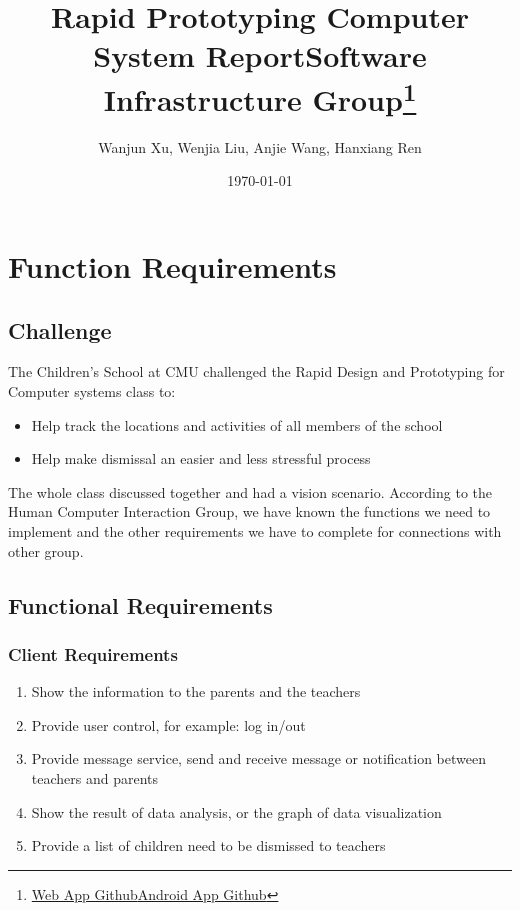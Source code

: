 \documentclass{article}
\begin{document}
\title{Rapid Prototyping Computer System Report\newline Software Infrastructure Group\footnote{\href{https://github.com/HanxRen/PrototypeReport}{Web App Github}\newline \href{https://github.com/1163710214X/Binocular}{Android App Github}}}
\author{Wanjun Xu, Wenjia Liu, Anjie Wang, Hanxiang Ren}
\date{\today}
\maketitle

\newpage

\tableofcontents

\newpage

\section{Function Requirements}

\subsection{Challenge}
 The Children’s School at CMU challenged the Rapid Design and Prototyping for Computer systems class to:
\begin{itemize}
	\item Help track the locations and activities of all members of the school 
	\item Help make dismissal an easier and less stressful process 
\end{itemize}

The whole class discussed together and had a vision scenario. According to the Human Computer Interaction Group, we have known the functions we need to implement and the other requirements we have to complete for connections with other group.

\subsection{Functional Requirements}
\subsubsection{Client Requirements}
\begin{enumerate}
	\item Show the information to the parents and the teachers
	\item Provide user control, for example: log in/out
	\item Provide message service, send and receive message or notification between teachers and parents 
	\item Show the result of data analysis, or the graph of data visualization
	\item Provide a list of children need to be dismissed to teachers
\end{enumerate}
\end{document}
